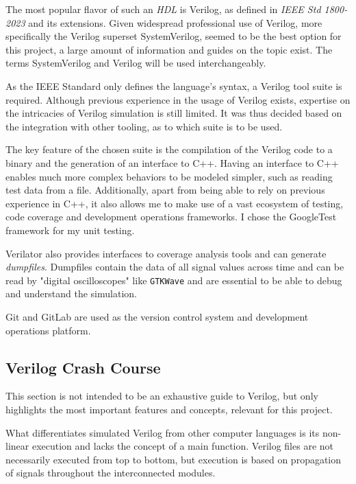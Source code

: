 The most popular flavor of such an \textit{HDL} is Verilog, as defined in \textit{IEEE Std 1800-2023} \cite{10458102} and its extensions. Given widespread professional use of Verilog, more specifically the Verilog superset SystemVerilog, seemed to be the best option for this project, a large amount of information and guides on the topic exist. The terms SystemVerilog and Verilog will be used interchangeably. 

As the IEEE Standard only defines the language's syntax, a Verilog tool suite is required. Although previous experience in the usage of Verilog exists, expertise on the intricacies of Verilog simulation is still limited. It was thus decided based on the integration with other tooling, as to which suite is to be used. 

The key feature of the chosen suite is the compilation of the Verilog code to a binary and the generation of an interface to C++. Having an interface to C++ enables much more complex behaviors to be modeled simpler, such as reading test data from a file. Additionally, apart from being able to rely on previous experience in C++, it also allows me to make use of a vast ecosystem of testing, code coverage and development operations frameworks. I chose the GoogleTest framework for my unit testing. 

Verilator also provides interfaces to coverage analysis tools and can generate \textit{dumpfiles}. Dumpfiles contain the data of all signal values across time and can be read by "digital oscilloscopes" like \texttt{GTKWave} and are essential to be able to debug and understand the simulation.

Git and GitLab are used as the version control system and development operations platform.

\subsection{Verilog Crash Course}
This section is not intended to be an exhaustive guide to Verilog, but only highlights the most important features and concepts, relevant for this project.

What differentiates simulated Verilog from other computer languages is its non-linear execution and lacks the concept of a main function. Verilog files are not necessarily executed from top to bottom, but execution is based on propagation of signals throughout the interconnected modules. 

